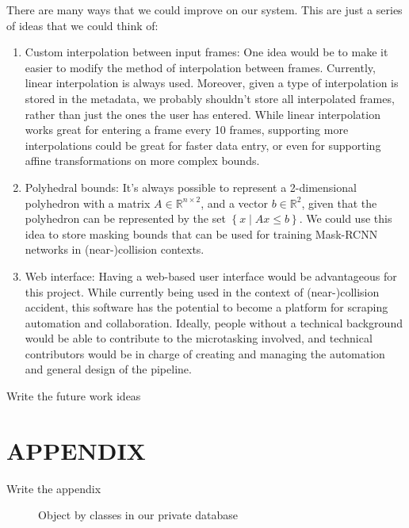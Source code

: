 \documentclass[letterpaper, 10 pt, conference]{IEEEconf}
\newcommand{\todo}[1]{{\color{red}#1}}
\begin{document}
There are many ways that we could improve on our system. This are just a series of ideas that we could think of:
\begin{enumerate}
\item Custom interpolation between input frames: One idea would be to make it easier to modify the method of interpolation between frames. Currently, linear interpolation is always used. Moreover, given a type of interpolation is stored in the metadata, we probably shouldn't store all interpolated frames, rather than just the ones the user has entered. While linear interpolation works great for entering a frame every 10 frames, supporting more interpolations could be great for faster data entry, or even for supporting affine transformations on more complex bounds.

\item Polyhedral bounds: It's always possible to represent a 2-dimensional polyhedron with a matrix $A\in\mathbb{R}^{n\times 2}$, and a vector $b\in\mathbb{R}^2$, given that the polyhedron can be represented by the set $\left\{x\mid Ax\leq b\right\}$. We could use this idea to store masking bounds that can be used for training Mask-RCNN networks in (near-)collision contexts.

\item Web interface: Having a web-based user interface would be advantageous for this project. While currently being used in the context of (near-)collision accident, this software has the potential to become a platform for scraping automation and collaboration. Ideally, people without a technical background would be able to contribute to the microtasking involved, and technical contributors would be in charge of creating and managing the automation and general design of the pipeline.

\end{enumerate}
\todo{Write the future work ideas}

\addtolength{\textheight}{-12cm}


\section*{APPENDIX}

\todo{Write the appendix}

\byclass


\begin{figure}[htpb]
		\centering
		\caption{Object by classes in our private database}
		\label{fig:obj-by-class}
\end{figure}
\end{document}
